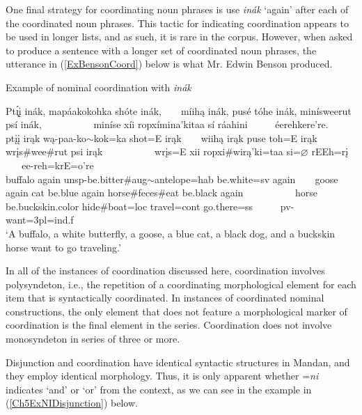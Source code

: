 One final strategy for coordinating noun phrases is use \textit{inák} `again' after each of the coordinated noun phrases. This tactic for indicating coordination appears to be used in longer lists, and as such, it is rare in the corpus. However, when asked to produce a sentence with a longer set of coordinated noun phrases, the utterance in (\ref{ExBensonCoord}) below is what Mr. Edwin Benson produced.

\begin{exe}

\item\label{ExBensonCoord} Example of nominal coordination with \textit{inák}

\glll Pt\'{ı̨}į inák, mapáakokohka shóte inák, ~ ~ míihą inák, pusé tóhe inák, minísweerut psí inák,  ~ ~ ~ ~ ~ ~  miníse xíi ropxímina'kitaa sí ráahini ~ ~ ~ éerehkere're.\\
ptįį irąk wą-paa-ko$\sim$kok=ka shot=E irąk ~ ~ wiihą irąk puse toh=E irąk wrįs\#wee\#rut psi irąk  ~ ~ ~ ~ ~ ~  wrįs=E xii ropxi\#wirą'ki=taa si=$\varnothing$ rEEh=rį ~ ~ ~ ee-reh=krE=o're\\
\textnormal{buffalo} \textnormal{again} unsp-\textnormal{be.bitter}\#aug$\sim$\textnormal{antelope}=hab \textnormal{be.white}=sv \textnormal{again} ~ ~ \textnormal{goose} \textnormal{again} \textnormal{cat} \textnormal{be.blue} \textnormal{again} \textnormal{horse}\#\textnormal{feces}\#\textnormal{eat} \textnormal{be.black} \textnormal{again} ~ ~ ~ ~ ~ ~ \textnormal{horse} \textnormal{be.buckskin.color} \textnormal{hide}\#\textnormal{boat}=loc \textnormal{travel}=cont \textnormal{go.there}=ss ~ ~ ~ pv-\textnormal{want}=3pl=ind.f\\
\glt `A buffalo, a white butterfly, a goose, a blue cat, a black dog, and a buckskin horse want to go traveling.' \citep[9]{bensonspottedbearkasak2016}
\end{exe}

In all of the instances of coordination discussed here, coordination involves polysyndeton, i.e., the repetition of a coordinating morphological element for each item that is syntactically coordinated. In instances of coordinated nominal constructions, the only element that does not feature a morphological marker of coordination is the final element in the series. Coordination does not involve monosyndeton in series of three or more.

Disjunction and coordination have identical syntactic structures in Mandan, and they employ identical morphology. Thus, it is only apparent whether =\textit{ni} indicates `and' or `or' from the context, as we can see in the example in (\ref{Ch5ExNIDisjunction}) below.

